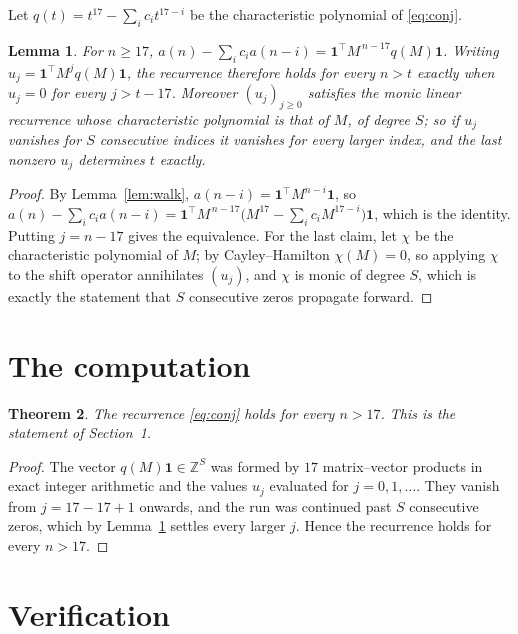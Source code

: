 \documentclass[11pt,a4paper]{article}
\theoremstyle{plain}
\newtheorem{theorem}{Theorem}
\newtheorem{lemma}[theorem]{Lemma}
\theoremstyle{definition}
\begin{document}
Let $q(t)=t^{17}-\sum_i c_i t^{17-i}$ be the characteristic polynomial of
\eqref{eq:conj}.

\begin{lemma}\label{lem:crit}
For $n\ge17$,
$a(n)-\sum_i c_i a(n-i)=\mathbf{1}^{\!\top}M^{\,n-17}q(M)\mathbf{1}$. Writing
$u_j=\mathbf{1}^{\!\top}M^{j}q(M)\mathbf{1}$, the recurrence therefore holds for every
$n>t$ exactly when $u_j=0$ for every $j>t-17$. Moreover $(u_j)_{j\ge0}$ satisfies the
monic linear recurrence whose characteristic polynomial is that of $M$, of degree $S$; so
if $u_j$ vanishes for $S$ consecutive indices it vanishes for every larger index, and the
last nonzero $u_j$ determines $t$ exactly.
\end{lemma}

\begin{proof}
By Lemma~\ref{lem:walk}, $a(n-i)=\mathbf{1}^{\!\top}M^{n-i}\mathbf{1}$, so
$a(n)-\sum_i c_i a(n-i)
=\mathbf{1}^{\!\top}M^{\,n-17}\bigl(M^{17}-\sum_i c_i M^{17-i}\bigr)
\mathbf{1}$, which is the identity. Putting $j=n-17$ gives the equivalence. For the
last claim, let $\chi$ be the characteristic polynomial of $M$; by Cayley--Hamilton
$\chi(M)=0$, so applying $\chi$ to the shift operator annihilates $(u_j)$, and $\chi$ is
monic of degree $S$, which is exactly the statement that $S$ consecutive zeros propagate
forward.
\end{proof}

\section{The computation}

\begin{theorem}
The recurrence \eqref{eq:conj} holds for every $n>17$. This is the statement of
Section~1.
\end{theorem}

\begin{proof}
The vector $q(M)\mathbf{1}\in\mathbb{Z}^{S}$ was formed by $17$ matrix--vector
products in exact integer arithmetic and the values $u_j$ evaluated for
$j=0,1,\dots$. They vanish from $j=17-17+1$ onwards, and the run was continued past
$S$ consecutive zeros, which by Lemma~\ref{lem:crit} settles every larger $j$. Hence the
recurrence holds for every $n>17$.
\end{proof}

\section{Verification}
\end{document}
